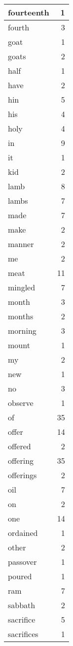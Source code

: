 \begin{center}
\begin{longtable}{l|r}
fourteenth & 1\\ \hline 
fourth & 3\\ \hline 
goat & 1\\ \hline 
goats & 2\\ \hline 
half & 1\\ \hline 
have & 2\\ \hline 
hin & 5\\ \hline 
his & 4\\ \hline 
holy & 4\\ \hline 
in & 9\\ \hline 
it & 1\\ \hline 
kid & 2\\ \hline 
lamb & 8\\ \hline 
lambs & 7\\ \hline 
made & 7\\ \hline 
make & 2\\ \hline 
manner & 2\\ \hline 
me & 2\\ \hline 
meat & 11\\ \hline 
mingled & 7\\ \hline 
month & 3\\ \hline 
months & 2\\ \hline 
morning & 3\\ \hline 
mount & 1\\ \hline 
my & 2\\ \hline 
new & 1\\ \hline 
no & 3\\ \hline 
observe & 1\\ \hline 
of & 35\\ \hline 
offer & 14\\ \hline 
offered & 2\\ \hline 
offering & 35\\ \hline 
offerings & 2\\ \hline 
oil & 7\\ \hline 
on & 2\\ \hline 
one & 14\\ \hline 
ordained & 1\\ \hline 
other & 2\\ \hline 
passover & 1\\ \hline 
poured & 1\\ \hline 
ram & 7\\ \hline 
sabbath & 2\\ \hline 
sacrifice & 5\\ \hline 
sacrifices & 1\\ \hline 

\end{longtable}
\end{center}
